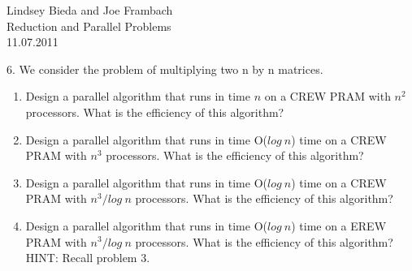 \documentclass[10pt]{article}
\begin{document}
	\begin{flushright}
	Lindsey Bieda and Joe Frambach\\
	Reduction and Parallel Problems\\
	11.07.2011
	\end{flushright}

6. We consider the problem of multiplying two n by n matrices.\\
\begin{enumerate}
\item Design a parallel algorithm that runs in time $n$ on a CREW PRAM with $n^2$
processors. What is the efficiency of this algorithm?
\item Design a parallel algorithm that runs in time O($log~n$) time on a CREW PRAM with $n^3$
processors. What is the efficiency of this algorithm?
\item Design a parallel algorithm that runs in time O($log~n$) time on a CREW PRAM with $n^3/log~n$
processors. What is the efficiency of this algorithm?
\item Design a parallel algorithm that runs in time O($log~n$) time on a EREW PRAM with $n^3/log~n$
processors. What is the efficiency of this algorithm? HINT: Recall problem 3.
\end{enumerate}
\end{document}
